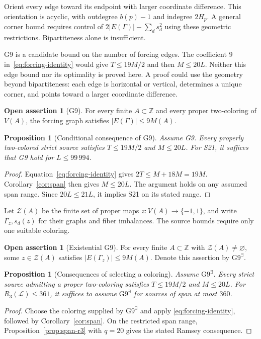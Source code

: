 \documentclass[11pt,a4paper]{article}
\newif\ifshowrevisions
\newcommand{\rev}[1]{{\ifshowrevisions\color{red}\fi #1}}
\newenvironment{revision}{\par\begingroup\ifshowrevisions\color{red}\fi}{\par\endgroup}
\newtheorem{proposition}[theorem]{Proposition}
\theoremstyle{definition}
\newtheorem{assertion}[theorem]{Open assertion}
\newcommand{\Lconf}{\mathcal L}
\newcommand{\Z}{\mathbb Z}
\numberwithin{equation}{section}
\begin{document}
Orient every edge toward its endpoint with larger coordinate difference.
This orientation is acyclic, with outdegree $b(p)-1$ and indegree $2H_p$.
A general corner bound requires control of
$2|E(\Gamma)|-\sum_ds_d^2$ using these geometric restrictions.
Bipartiteness alone is insufficient.

\begin{revision}
G9 is a candidate bound on the number of forcing edges. The coefficient $9$ in~\eqref{eq:forcing-identity} would give $T\le19M/2$ and then $M\le20L$. Neither this edge bound nor its optimality is proved here. A proof could use the geometry beyond bipartiteness: each edge is horizontal or vertical, determines a unique corner, and points toward a larger coordinate difference.
\end{revision}

\begin{assertion}[G9]\label{open:g9}
For every finite $A\subset\Z$ and every proper two-coloring of $V(A)$,
the forcing graph satisfies $|E(\Gamma)|\le9M(A)$.
\end{assertion}

\begin{proposition}[Conditional consequence of G9]\label{prop:g9}
Assume G9. Every properly two-colored strict source satisfies
$T\le19M/2$ and $M\le20L$.
For S21, it suffices that G9 hold for $L\le99\,994$.
\end{proposition}
\begin{proof}
Equation~\eqref{eq:forcing-identity} gives $2T\le M+18M=19M$.
Corollary~\ref{cor:span} then gives $M\le20L$.
The argument holds on any assumed span range. Since $20L\le21L$,
it implies S21 on its stated range.
\end{proof}

Let $\mathcal Z(A)$ be the finite set of proper maps
$z:V(A)\to\{-1,1\}$, and write $\Gamma_z,s_d(z)$ for their graphs
and fiber imbalances. The source bounds require only one
suitable coloring.

\begin{assertion}[Existential G9]\label{open:g9-exists}
\rev{For every finite $A\subset\Z$ with $\mathcal Z(A)\ne\varnothing$, some $z\in\mathcal Z(A)$ satisfies $|E(\Gamma_z)|\le9M(A)$.} Denote this assertion by $\mathrm{G9}^{\exists}$.
\end{assertion}

\begin{proposition}[Consequences of selecting a coloring]\label{prop:g9-exists}
Assume $\mathrm{G9}^{\exists}$. Every strict source admitting a proper
two-coloring satisfies $T\le19M/2$ and $M\le20L$.
For $R_3(\Lconf)\le361$, it suffices to assume
$\mathrm{G9}^{\exists}$ for sources of span at most $360$.
\end{proposition}
\begin{proof}
Choose the coloring supplied by $\mathrm{G9}^{\exists}$ and apply
\eqref{eq:forcing-identity}, followed by Corollary~\ref{cor:span}.
On the restricted span range, Proposition~\ref{prop:span-r3} with
$q=20$ gives the stated Ramsey consequence.
\end{proof}
\end{document}
